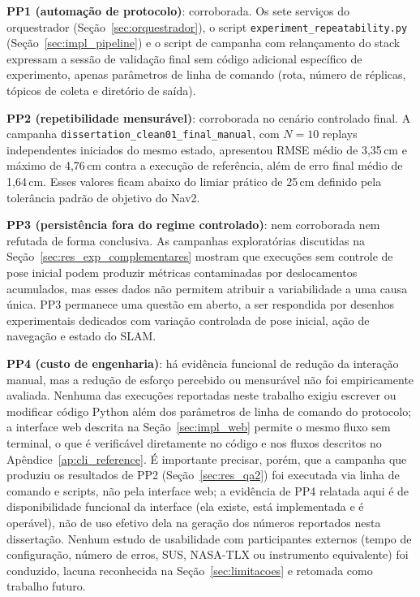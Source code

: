 \textbf{PP1 (automação de protocolo)}: corroborada. Os sete serviços do
orquestrador (Seção~\ref{sec:orquestrador}), o script
\texttt{experiment\_\allowbreak repeatability.py} (Seção~\ref{sec:impl_pipeline}) e o script de
campanha com relançamento do stack expressam a sessão de validação final sem
código adicional específico de experimento, apenas parâmetros de linha de
comando (rota, número de réplicas, tópicos de coleta e diretório de saída).

\textbf{PP2 (repetibilidade mensurável)}: corroborada no cenário controlado
final. A campanha \texttt{dissertation\_\allowbreak clean01\_\allowbreak final\_\allowbreak manual},
com $N=10$ replays independentes iniciados do mesmo estado, apresentou RMSE
médio de 3,35\,cm e máximo de 4,76\,cm contra a execução de referência, além de
erro final médio de 1,64\,cm. Esses valores ficam abaixo do limiar prático de
25\,cm definido pela tolerância padrão de objetivo do Nav2.

\textbf{PP3 (persistência fora do regime controlado)}: nem corroborada nem
refutada de forma conclusiva. As campanhas exploratórias discutidas na
Seção~\ref{sec:res_exp_complementares} mostram que execuções sem controle de
pose inicial podem produzir métricas contaminadas por deslocamentos acumulados,
mas esses dados não permitem atribuir a variabilidade a uma causa única. PP3
permanece uma questão em aberto, a ser respondida por desenhos experimentais
dedicados com variação controlada de pose inicial, ação de navegação e estado do
SLAM.

\textbf{PP4 (custo de engenharia)}: há evidência funcional de redução da
interação manual, mas a redução de esforço percebido ou mensurável não foi
empiricamente avaliada. Nenhuma das execuções reportadas neste trabalho exigiu
escrever ou modificar código Python além dos parâmetros de linha de comando do
protocolo; a interface web descrita na Seção~\ref{sec:impl_web} permite o mesmo
fluxo sem terminal, o que é verificável diretamente no código e nos fluxos
descritos no Apêndice~\ref{ap:cli_reference}. É importante precisar, porém,
que a campanha que produziu os resultados de PP2 (Seção~\ref{sec:res_qa2}) foi
executada via linha de comando e scripts, não pela interface web; a evidência
de PP4 relatada aqui é de disponibilidade funcional da interface (ela
existe, está implementada e é operável), não de uso efetivo dela na geração
dos números reportados nesta dissertação. Nenhum estudo de usabilidade com
participantes externos (tempo de configuração, número de erros, SUS, NASA-TLX
ou instrumento equivalente) foi conduzido, lacuna reconhecida na
Seção~\ref{sec:limitacoes} e retomada como trabalho futuro.

